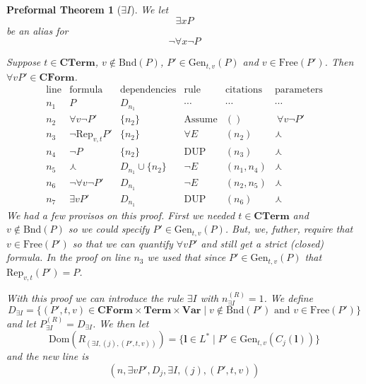 \documentclass[oneside, 12pt]{book}
\theoremstyle{break}
\newtheorem{preformal definition}[definition]{Preformal Definition}
\newtheorem{preformal theorem}[theorem]{Preformal Theorem}
\newcommand{\bv}[1]{\boldsymbol{#1}}
\begin{document}
		\begin{preformal theorem}[$\exists I$]
			We let
			\begin{equation*}
				\exists x P
			\end{equation*}
			be an alias for
			\begin{equation*}
				\lnot \forall x \lnot P
			\end{equation*}
			
			Suppose $t\in \textbf{CTerm}$, $v \not \in \text{Bnd}(P)$, $P' \in \text{Gen}_{t, v}(P)$ and $v\in \text{Free}(P')$.
			Then $\forall v P' \in \textbf{CForm}$.
			\begin{equation*}
				\begin{array}{c|c|c|c|c|c}
					\text{line} & \text{formula} & \text{dependencies} & \text{rule} & \text{citations} & \text{parameters}\\ \hline
					n_1 & P & D_{n_1} & \cdots & \cdots & \cdots\\
					n_2 & \forall v \lnot P' & \{n_2\} & \text{Assume} & () & \ \forall v \lnot P'\\
					n_3 & \lnot \text{Rep}_{v, t} P'& \{n_2\} & \forall E & (n_2) & \curlywedge\\
					n_4 & \lnot P & \{n_2\} & \text{DUP}& (n_3) & \curlywedge\\		
					n_5 & \curlywedge& D_{n_1} \cup \{n_2\} & \lnot E & (n_1, n_4) & \curlywedge\\
					n_6 & \lnot \forall v \lnot P' & D_{n_1} & \lnot E & (n_2, n_5) & \curlywedge\\
					n_7 & \exists v P' & D_{n_1} & \text{DUP} & (n_6) & \curlywedge				
				\end{array}
			\end{equation*}
			We had a few provisos on this proof. 
			First we needed $t\in \textbf{CTerm}$ and $v\not \in \text{Bnd}(P)$ so we could specify $P' \in \text{Gen}_{t, v}(P)$.
			But, we, futher, require that $v\in \text{Free}(P')$ so that we can quantify $\forall v P'$ and still get a strict (closed) formula.
			In the proof on line $n_3$ we used that since $P' \in \text{Gen}_{t, v}(P)$ that $\text{Rep}_{v, t}(P') = P$.
			
			With this proof we can introduce the rule $\exists I$ with $n_{\exists I}^{(R)} = 1$.
			We define
			\begin{equation*}
				D_{\exists I} = \{(P', t, v) \in \textbf{CForm} \times \textbf{Term} \times \textbf{Var} \mid v\not \in \text{Bnd}(P') \text{ and } v \in \text{Free}(P')\}
			\end{equation*}
			and let $P_{\exists I}^{(R)} = D_{\exists I}$.
			We then let
			\begin{equation*}
				\text{Dom}(R_{(\exists I, (j), (P', t, v))}) = \{\bv{l} \in L^* \mid P' \in \text{Gen}_{t, v}(C_j(\bv{l}))\}			
			\end{equation*}
			and the new line is
			\begin{equation*}
				(n, \exists v P', D_j, \exists I, (j), (P', t, v))
			\end{equation*}
		\end{preformal theorem}
		
\end{document}
